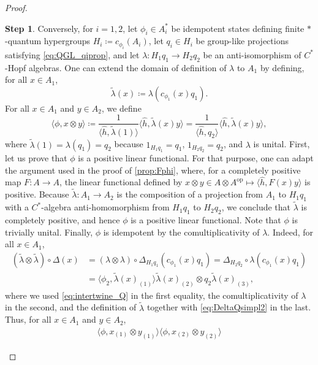 \documentclass[a4paper,10pt]{amsart}
\newcommand{\eval}[2]{\langle #1 , #2\rangle}
\theoremstyle{definition}
\newtheorem{step-goursat}{Step}
\begin{document}
\begin{proof}
\begin{step-goursat}
Conversely, for $i=1,2$, let $\phi_i\in A_i^*$ be idempotent states defining finite $*$-quantum hypergroups $H_i \coloneqq c_{\phi_i}(A_i)$, let $q_i \in H_i$ be group-like projections satisfying \cref{eq:QGL_qiprop}, and let $\lambda : H_1 q_1 \to H_2 q_2$ be an anti-isomorphism of $C^*$-Hopf algebras.
\smallbreak\noindent%
One can extend the domain of definition of $\lambda$ to $A_1$ by defining, for all $x\in A_1$,
\[
    \tilde{\lambda}(x)
    \coloneqq
    \lambda(c_{\phi_1}(x)q_1).
\]
For all $x\in A_1$ and $y\in A_2$, we define
\[
    \eval{\phi}{x \otimes y}
    \coloneqq
    \frac{1}{\eval{\hat{h}}{\tilde{\lambda}(1)}}
    \eval{\hat{h}}{\tilde{\lambda}(x) y}
    =
    \frac{1}{\eval{\hat{h}}{q_2}}
    \eval{\hat{h}}{\tilde{\lambda}(x) y},
\]
where $\tilde{\lambda}(1)=\lambda(q_1)=q_2$ because $1_{H_1 q_1}=q_1$, $1_{H_2 q_2}=q_2$, and $\lambda$ is unital.
\smallbreak\noindent%
First, let us prove that $\phi$ is a positive linear functional.
For that purpose, one can adapt the argument used in the proof of \cref{prop:Fphi}, where, for a completely positive map $F : A\to A$, the linear functional defined by $x\otimes y \in A\otimes A^{\mathrm{op}} \mapsto \eval{\hat{h}}{F(x)y}$ is positive.
Because $\tilde{\lambda} : A_1 \to A_2$ is the composition of a projection from $A_1$ to $H_1 q_1$ with a $C^*$-al\-ge\-bra anti-homomorphism from $H_1 q_1$ to $H_2 q_2$, we conclude that $\tilde\lambda$ is completely positive, and hence $\phi$ is a positive linear functional.
Note that $\phi$ is trivially unital.
\smallbreak\noindent%
Finally, $\phi$ is idempotent by the comultiplicativity of $\lambda$. Indeed, for all $x\in A_1$,
\begin{align} \label{eq:lambda_intertwine}
    (\tilde{\lambda} \otimes \tilde{\lambda}) \circ \Delta(x)
    &=
    (\lambda \otimes \lambda) \circ \Delta_{H_1q_1}(c_{\phi_1}(x)q_1)
    =
    \Delta_{H_2q_2} \circ \lambda(c_{\phi_1}(x)q_1)
    \\
    &=
    \eval{\phi_2}{\tilde{\lambda}(x)_{(1)}}
        \tilde{\lambda}(x)_{(2)}
        \otimes q_2 \tilde{\lambda}(x)_{(3)},
\end{align}
where we used \cref{eq:intertwine_Q} in the first equality, the comultiplicativity of $\lambda$ in the second, and the definition of $\tilde{\lambda}$ together with \cref{eq:DeltaQsimpl2} in the last.
Thus, for all $x\in A_1$ and $y \in A_2$,
\begin{align*}
    \eval{\phi}{x_{(1)}\otimes y_{(1)}}
        \eval{\phi}{x_{(2)}\otimes y_{(2)}}

\end{align*}
\end{step-goursat}
\end{proof}
\end{document}
